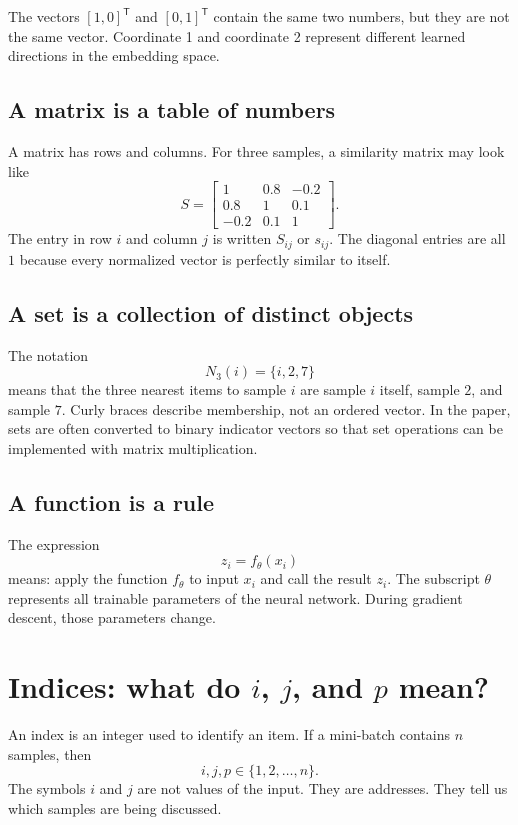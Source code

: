 \documentclass[11pt,oneside,openany]{book}
\theoremstyle{myplain}
\theoremstyle{definition}
\begin{document}
\begin{conceptbox}[title=Why order matters]
The vectors $[1,0]^{\mathsf T}$ and $[0,1]^{\mathsf T}$ contain the same two numbers, but they are not the same vector. Coordinate 1 and coordinate 2 represent different learned directions in the embedding space.
\end{conceptbox}

\subsection{A matrix is a table of numbers}

A matrix has rows and columns. For three samples, a similarity matrix may look like
\[
S=
\begin{bmatrix}
1 & 0.8 & -0.2\\
0.8 & 1 & 0.1\\
-0.2 & 0.1 & 1
\end{bmatrix}.
\]
The entry in row $i$ and column $j$ is written $S_{ij}$ or $s_{ij}$. The diagonal entries are all $1$ because every normalized vector is perfectly similar to itself.

\subsection{A set is a collection of distinct objects}

The notation
\[
  N_3(i)=\{i,2,7\}
\]
means that the three nearest items to sample $i$ are sample $i$ itself, sample $2$, and sample $7$. Curly braces describe membership, not an ordered vector. In the paper, sets are often converted to binary indicator vectors so that set operations can be implemented with matrix multiplication.

\subsection{A function is a rule}

The expression
\[
  z_i=f_\theta(x_i)
\]
means: apply the function $f_\theta$ to input $x_i$ and call the result $z_i$. The subscript $\theta$ represents all trainable parameters of the neural network. During gradient descent, those parameters change.

\section{Indices: what do $i$, $j$, and $p$ mean?}

An index is an integer used to identify an item. If a mini-batch contains $n$ samples, then
\[
  i,j,p\in\{1,2,\ldots,n\}.
\]
The symbols $i$ and $j$ are not values of the input. They are addresses. They tell us which samples are being discussed.
\end{document}
